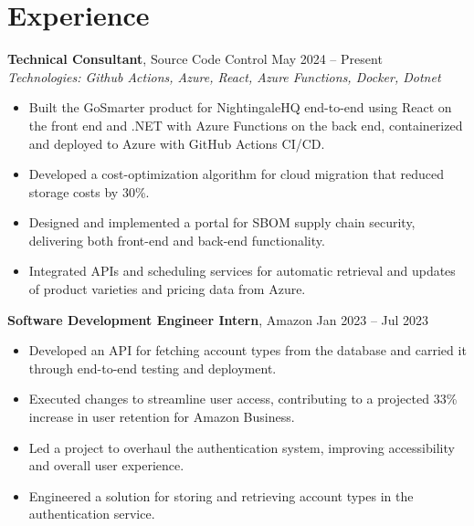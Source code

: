 \documentclass[11pt,a4paper]{article}
\begin{document}
\section{Experience}
\textbf{Technical Consultant}, Source Code Control \hfill May 2024 -- Present
\\ \textit{Technologies: Github Actions, Azure, React, Azure Functions, Docker, Dotnet}
\begin{itemize}
  \item Built the GoSmarter product for NightingaleHQ end-to-end using React on the front end and .NET with Azure Functions on the back end, containerized and deployed to Azure with GitHub Actions CI/CD.
  \item Developed a cost-optimization algorithm for cloud migration that reduced storage costs by 30\%.
  \item Designed and implemented a portal for SBOM supply chain security, delivering both front-end and back-end functionality.
  \item Integrated APIs and scheduling services for automatic retrieval and updates of product varieties and pricing data from Azure.
\end{itemize}
\vspace{2pt}
\textbf{Software Development Engineer Intern}, Amazon \hfill Jan 2023 -- Jul 2023
\begin{itemize}
  \item Developed an API for fetching account types from the database and carried it through end-to-end testing and deployment.
  \item Executed changes to streamline user access, contributing to a projected 33\% increase in user retention for Amazon Business.
  \item Led a project to overhaul the authentication system, improving accessibility and overall user experience.
  \item Engineered a solution for storing and retrieving account types in the authentication service.
\end{itemize}
\vspace{2pt}
\end{document}
